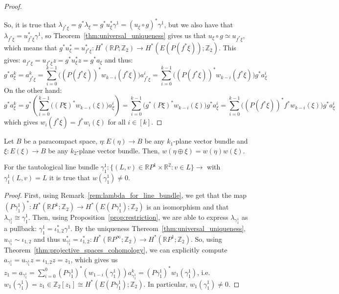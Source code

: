 \begin{proof}
\begin{center}
\end{center}
So, it is true that $\lambda_{f^*\xi}=g^*\lambda_{\xi}=g^*u_{\xi}^*\gamma^1=(u_{\xi}\circ g)^*\gamma^1$, but we also have that $\lambda_{f^*\xi}=u^*_{f^*\xi}\gamma^1$, so Theorem~\ref{thm:universal_uniqueness} gives us that $u_{\xi}\circ g\simeq u_{f^*\xi}$, which means that $g^*u^*_{\xi}=u^*_{f^*\xi}:H^*(\mathbb{R}P;\mathbb{Z}_2)\to H^*(E(P(f^*\xi));\mathbb{Z}_2)$. This gives: $a_{f^*\xi}=u_{f^*\xi}z=g^*u^*_{\xi}z=g^*a_{\xi}$ and thus:
\[g^*a^k_{\xi}=a^k_{f^*\xi}=\sum_{i=0}^{k-1}\Big((P(f^*\xi))^*w_{k-i}(f^*\xi)\Big)a_{f^*\xi}^i=\sum_{i=0}^{k-1}\Big((P(f^*\xi))^*w_{k-i}(f^*\xi)\Big)g^*a_{\xi}^i\]
On the other hand:
\[g^*a^k_{\xi}=g^*\left(\sum_{i=0}^{k-1}\Big((P\xi)^*w_{k-i}(\xi)\Big)a_{\xi}^i\right)=\sum_{i=0}^{k-1}\Big(g^*(P\xi)^*w_{k-i}(\xi)\Big)g^*a_{\xi}^i=\sum_{i=0}^{k-1}\Big((P(f^*\xi))^*f^*w_{k-i}(\xi)\Big)g^*a_{\xi}^i\]
which gives $w_i(f^*\xi)=f^*w_i(\xi)$ for all $i\in[k]$.
\end{proof}

\begin{proposition} Let $B$ be a paracompact space, $\eta:E(\eta)\to B$ be any $k_1$-plane vector bundle and $\xi:E(\xi)\to B$ be any $k_2$-plane vector bundle. Then, $w(\eta\oplus\xi)=w(\eta)w(\xi)$.
\end{proposition}

\begin{proposition} For the tautological line bundle $\gamma_1^1:\big\{(L,v)\in\mathbb{R}P^1\times\mathbb{R}^2:v\in L\big\}\to$ with $\gamma_1^1(L,v)=L$ it is true that $w(\gamma_1^1)\neq0$.
\end{proposition}
\begin{proof} First, using Remark~\ref{rem:lambda_for_line_bundle}, we get that the map $(P\gamma_1^1)^*:H^*(\mathbb{R}P^1;\mathbb{Z}_2)\to H^*(E(P\gamma_1^1);\mathbb{Z}_2)$ is an isomorphism and that $\lambda_{\gamma_1^1}\cong\gamma_1^1$. Then, using Proposition~\ref{prop:restriction}, we are able to express $\lambda_{\gamma_1^1}$ as a pullback: $\gamma_1^1=\iota_{1,2}^*\gamma^1$. By the uniqueness Thereom~\ref{thm:universal_uniqueness}, $u_{\gamma_1^1}\sim\iota_{1,2}$ and thus $u_{\gamma_1^1}^*=\iota_{1,2}^*:H^*(\mathbb{R}P^{\infty};\mathbb{Z}_2)\to H^*(\mathbb{R}P^1;\mathbb{Z}_2)$. So, using Theorem~\ref{thm:projective_spaces_cohomology}, we can explicitly compute $a_{\gamma_1^1}=u_{\gamma_1^1}z=\iota_{1,2}z=z_1$, which gives us $z_1=a_{\gamma_1^1}=\sum_{i=0}^0(P\gamma_1^1)^*(w_{1-i}(\gamma_1^1))a_{\gamma_1^1}^k=(P\gamma_1^1)^*w_1(\gamma_1^1)$, i.e. $w_1(\gamma_1^1)=z_1\in\mathbb{Z}_2[z_1]\cong H^*(E(P\gamma_1^1);\mathbb{Z}_2)$. In particular, $w_1(\gamma_1^1)\neq0$.
\end{proof}


